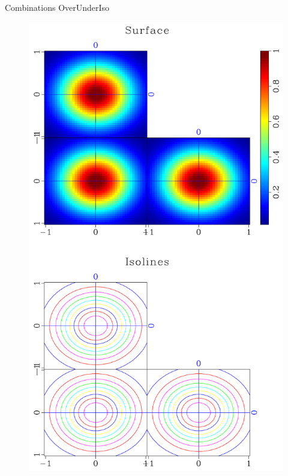 \begin{frame}
  \begin{block}{Combinations}
    OverUnderIso \\

     \begin{figure}
     \includegraphics[scale=0.25]{plot/Fig/ganom-5.pdf}
     \end{figure}


  \end{block}
\end{frame}
    
